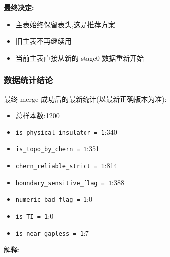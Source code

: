 \documentclass[lang=cn,scheme=chinese,color=blue,device=normal,toc=onecol,math=cm]{elegantbook}
\begin{document}
\begin{enumerate}
\textbf{最终决定:}\par
 
\begin{itemize}
\item 主表始终保留表头,这是推荐方案
\item 旧主表不再继续用
\item 当前主表直接从新的 stage0 数据重新开始
\end{itemize}
\end{enumerate}


\subsubsection{数据统计结论}


最终 merge 成功后的最新统计(以最新正确版本为准):\par


\begin{itemize}
\item 总样本数:1200
\item \texttt{is\_\allowbreak{}physical\_\allowbreak{}insulator = 1}:340
\item \texttt{is\_\allowbreak{}topo\_\allowbreak{}by\_\allowbreak{}chern = 1}:351
\item \texttt{chern\_\allowbreak{}reliable\_\allowbreak{}strict = 1}:814
\item \texttt{boundary\_\allowbreak{}sensitive\_\allowbreak{}flag = 1}:388
\item \texttt{numeric\_\allowbreak{}bad\_\allowbreak{}flag = 1}:0
\item \texttt{is\_\allowbreak{}TI = 1}:0
\item \texttt{is\_\allowbreak{}near\_\allowbreak{}gapless = 1}:7
\end{itemize}


解释:\par
\end{document}
